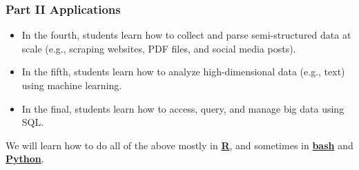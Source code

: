 \documentclass[
]{article}
\begin{document}
\hypertarget{part-ii-applications}{%
\subsubsection{Part II Applications}\label{part-ii-applications}}

\begin{itemize}
\item
  In the fourth, students learn how to collect and parse semi-structured
  data at scale (e.g., scraping websites, PDF files, and social media
  posts).
\item
  In the fifth, students learn how to analyze high-dimensional data
  (e.g., text) using machine learning.
\item
  In the final, students learn how to access, query, and manage big data
  using SQL.
\end{itemize}

We will learn how to do all of the above mostly in
\href{https://www.r-project.org/about.html}{\textbf{R}}, and sometimes
in \href{https://www.gnu.org/software/bash/}{\textbf{bash}} and
\href{https://www.python.org/about/}{\textbf{Python}}.
\end{document}
